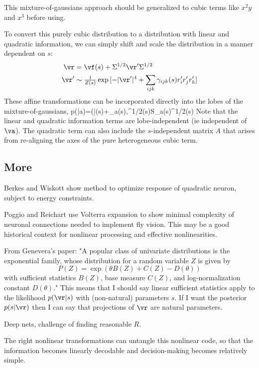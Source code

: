 \documentclass[11pt,twocolumn]{article}
\begin{document}
{\color{red}This mixture-of-gaussians approach should be generalized to cubic terms like $x^2y$ and $x^3$ before using.}

To convert this purely cubic distribution to a distribution with linear and quadratic information, we can simply shift and scale the distribution in a manner dependent on $s$:
\begin{align}
\vr&=\vf(s)+\Sigma^{1/2}\vr'\Sigma^{1/2}\\
\vr'&\sim \tfrac{1}{Z(s)}\exp{[-|\vr'|^4+\sum_{ijk}\gamma_{ijk}(s)r'_ir'_jr'_k]}
\end{align}
These affine transformations can be incorporated directly into the lobes of the mixture-of-gaussians,
\be
p(\vr|a)=(\vr|\vf(s)+\vm_a(s),\Sigma^{1/2}(s)S_a(s)\Sigma^{1/2}(s)
\ee
Note that the linear and quadratic information terms are lobe-independent (ie independent of $\va$). The quadratic term can also include the $s$-independent matrix $A$ that arises from re-aligning the axes of the pure heterogeneous cubic term.




\subsection{More}


Berkes and Wiskott show method to optimize response of quadratic neuron, subject to energy constraints.

Poggio and Reichart use Volterra expansion to show minimal complexity of neuronal connections needed to implement fly vision. This may be a good historical context for nonlinear processing and effective nonlinearities.


From Genevera's paper: "A popular class of univariate distributions is the exponential family, whose distribution for a random variable $Z$ is given by
$$P(Z) = \exp{(\theta B(Z) + C(Z) - D(\theta))}$$
with sufficient statistics $B(Z)$, base measure $C(Z)$, and log-normalization constant $D(\theta)$." This means that I should say linear sufficient statistics apply to the likelihood $p(\vr|s)$ with (non-natural) parameters $s$. If I want the posterior $p(s|\vr)$ then I can say that projections of $\vr$ are natural parameters.

Deep nets, challenge of finding reasonable $R$.

The right nonlinear transformations can untangle this nonlinear code, so that the information becomes linearly decodable \cite{riesenhuber1999hierarchical,anselmi2013unsupervised,Bengio,Cox,NotNoisyJustWrong} and decision-making becomes relatively simple.
\end{document}
